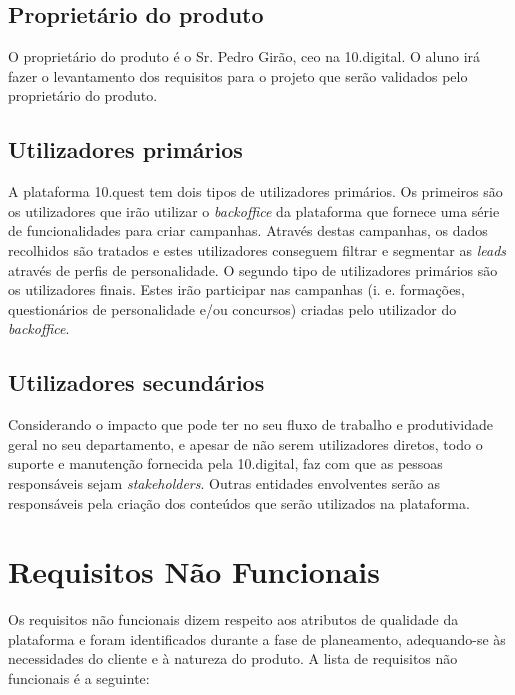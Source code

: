 \subsection{Proprietário do produto}

O proprietário do produto é o Sr. Pedro Girão, \acrshort{ceo} na 10.digital. O aluno irá fazer o levantamento dos requisitos para o projeto que serão validados pelo proprietário do produto.

\subsection{Utilizadores primários}

A plataforma 10.quest tem dois tipos de utilizadores primários. Os primeiros são os utilizadores que irão utilizar o \textit{backoffice} da plataforma que fornece uma série de funcionalidades para criar campanhas. Através destas campanhas, os dados recolhidos são tratados e estes utilizadores conseguem filtrar e segmentar as \textit{leads} através de perfis de personalidade. O segundo tipo de utilizadores primários são os utilizadores finais. Estes irão participar nas campanhas (i. e. formações, questionários de personalidade e/ou concursos) criadas pelo utilizador do \textit{backoffice}.


\subsection{Utilizadores secundários}

Considerando o impacto que pode ter no seu fluxo de trabalho e produtividade geral no seu departamento, e apesar de não serem utilizadores diretos, todo o suporte e manutenção fornecida pela 10.digital, faz com que as pessoas responsáveis sejam \textit{stakeholders}.
Outras entidades envolventes serão as responsáveis pela criação dos conteúdos que serão utilizados na plataforma.


\section{Requisitos Não Funcionais}
\label{rnf}

Os requisitos não funcionais dizem respeito aos atributos de qualidade da plataforma e foram identificados durante a fase de planeamento, adequando-se às necessidades do cliente e à natureza do produto. A lista de requisitos não funcionais é a seguinte:

